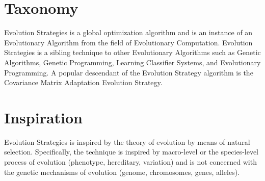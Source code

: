 \documentclass[a4paper, 11pt]{article}
\begin{document}
\section{Taxonomy}
\label{sec:taxonomy}
Evolution Strategies is a global optimization algorithm and is an instance of an Evolutionary Algorithm from the field of Evolutionary Computation.
Evolution Strategies is a sibling technique to other Evolutionary Algorithms such as Genetic Algorithms, Genetic Programming, Learning Classifier Systems, and Evolutionary Programming. A popular descendant of the Evolution Strategy algorithm is the Covariance Matrix Adaptation Evolution Strategy.

\section{Inspiration}
\label{sec:inspiration}
Evolution Strategies is inspired by the theory of evolution by means of natural selection.
Specifically, the technique is inspired by macro-level or the species-level process of evolution (phenotype, hereditary, variation) and is not concerned with the genetic mechanisms of evolution (genome, chromosomes, genes, alleles).
\end{document}

